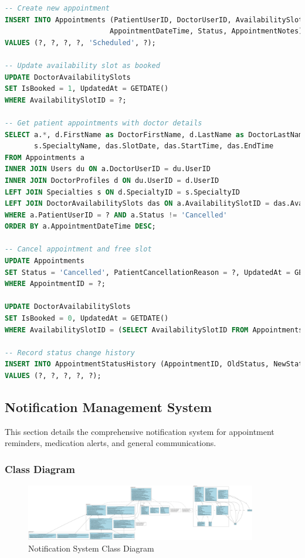 \documentclass[12pt,a4paper]{article}
\begin{document}
\begin{lstlisting}[language=SQL, caption=Appointment Management Queries]
-- Create new appointment
INSERT INTO Appointments (PatientUserID, DoctorUserID, AvailabilitySlotID, 
                         AppointmentDateTime, Status, AppointmentNotes)
VALUES (?, ?, ?, ?, 'Scheduled', ?);

-- Update availability slot as booked
UPDATE DoctorAvailabilitySlots 
SET IsBooked = 1, UpdatedAt = GETDATE() 
WHERE AvailabilitySlotID = ?;

-- Get patient appointments with doctor details
SELECT a.*, d.FirstName as DoctorFirstName, d.LastName as DoctorLastName, 
       s.SpecialtyName, das.SlotDate, das.StartTime, das.EndTime
FROM Appointments a
INNER JOIN Users du ON a.DoctorUserID = du.UserID
INNER JOIN DoctorProfiles d ON du.UserID = d.UserID
LEFT JOIN Specialties s ON d.SpecialtyID = s.SpecialtyID
LEFT JOIN DoctorAvailabilitySlots das ON a.AvailabilitySlotID = das.AvailabilitySlotID
WHERE a.PatientUserID = ? AND a.Status != 'Cancelled'
ORDER BY a.AppointmentDateTime DESC;

-- Cancel appointment and free slot
UPDATE Appointments 
SET Status = 'Cancelled', PatientCancellationReason = ?, UpdatedAt = GETDATE()
WHERE AppointmentID = ?;

UPDATE DoctorAvailabilitySlots 
SET IsBooked = 0, UpdatedAt = GETDATE() 
WHERE AvailabilitySlotID = (SELECT AvailabilitySlotID FROM Appointments WHERE AppointmentID = ?);

-- Record status change history
INSERT INTO AppointmentStatusHistory (AppointmentID, OldStatus, NewStatus, ChangeReason, ChangedByUserID)
VALUES (?, ?, ?, ?, ?);
\end{lstlisting}

\subsection{Notification Management System}

This section details the comprehensive notification system for appointment reminders, medication alerts, and general communications.

\subsubsection{Class Diagram}

\begin{figure}[H]
\centering
\includegraphics[width=0.9\textwidth]{diagrams/notification_class_diagram.svg}
\caption{Notification System Class Diagram}
\label{fig:notification-class-diagram}
\end{figure}
\end{document}

